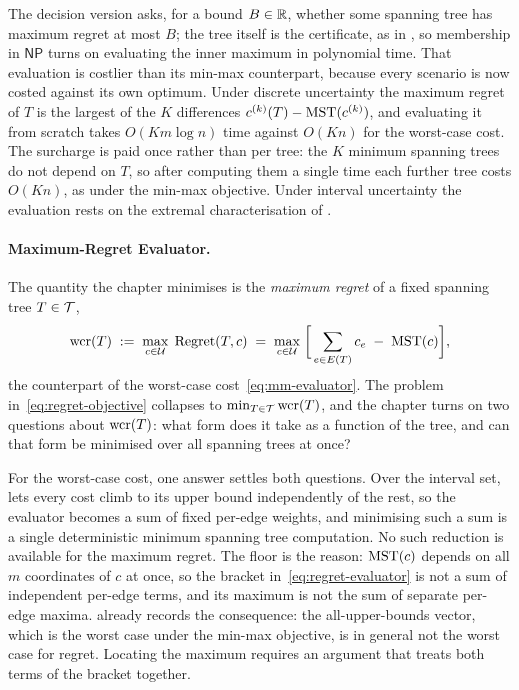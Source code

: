 The decision version asks, for a bound $B \in \mathbb{R}$, whether some spanning tree has maximum regret at most $B$; the tree itself is the certificate, as in , so membership in $\mathsf{NP}$ turns on evaluating the inner maximum in polynomial time.
That evaluation is costlier than its min-max counterpart, because every scenario is now costed against its own optimum.
Under discrete uncertainty the maximum regret of $T$ is the largest of the $K$ differences $c^{(k)}(T) - \mathrm{MST}(c^{(k)})$, and evaluating it from scratch takes $O(Km \log n)$ time against $O(Kn)$ for the worst-case cost.
The surcharge is paid once rather than per tree: the $K$ minimum spanning trees do not depend on $T$, so after computing them a single time each further tree costs $O(Kn)$, as under the min-max objective.
Under interval uncertainty the evaluation rests on the extremal characterisation of .

\paragraph{Maximum-Regret Evaluator.}

The quantity the chapter minimises is the \emph{\textcolor{RWTHBlue}{maximum regret}} of a fixed spanning tree $T \in \mathcal{T}$,
\begin{equation}\label{eq:regret-evaluator}
\mathrm{wcr}(T) \;:=\; \max_{c \in \mathcal{U}}\; \operatorname{Regret}(T,c) \;=\; \max_{c \in \mathcal{U}}\; \biggl[\, \sum_{e \in E(T)} c_e \;-\; \mathrm{MST}(c) \biggr],
\end{equation}
the counterpart of the worst-case cost~\eqref{eq:mm-evaluator}.
The problem in~\eqref{eq:regret-objective} collapses to $\min_{T \in \mathcal{T}} \mathrm{wcr}(T)$, and the chapter turns on two questions about $\mathrm{wcr}(T)$: what form does it take as a function of the tree, and can that form be minimised over all spanning trees at once?

For the worst-case cost, one answer settles both questions.
Over the interval set,  lets every cost climb to its upper bound independently of the rest, so the evaluator becomes a sum of fixed per-edge weights, and minimising such a sum is a single deterministic minimum spanning tree computation.
No such reduction is available for the maximum regret.
The floor is the reason: $\mathrm{MST}(c)$ depends on all $m$ coordinates of $c$ at once, so the bracket in~\eqref{eq:regret-evaluator} is not a sum of independent per-edge terms, and its maximum is not the sum of separate per-edge maxima.
 already records the consequence: the all-upper-bounds vector, which is the worst case under the min-max objective, is in general not the worst case for regret.
Locating the maximum requires an argument that treats both terms of the bracket together.

